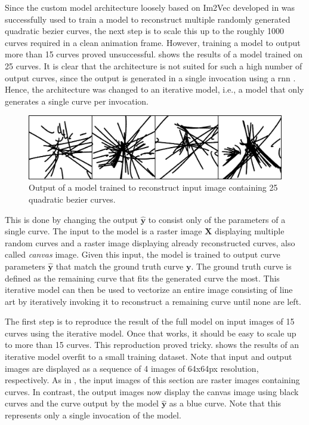 Since the custom model architecture loosely based on Im2Vec \citep{DBLP:conf/cvpr/Reddy21} developed in  was successfully used to train a model to reconstruct multiple randomly generated quadratic bezier curves, the next step is to scale this up to the roughly \num{1000} curves required in a clean animation frame. However, training a model to output more than 15 curves proved unsuccessful.  shows the results of a model trained on 25 curves. It is clear that the architecture is not suited for such a high number of output curves, since the output is generated in a single invocation using a \gls{rnn} \citep{hochreiterdipl,Bengio:1994:LLD:2325857.2328340}. Hence, the architecture was changed to an iterative model, i.e., a model that only generates a single curve per invocation.

\begin{figure}
    \centering
    \includegraphics[width=\textwidth]{graphics/work-artifacts/im2vec/recons_VectorVAEnLayers_1335.png}
    \caption{Output of a model trained to reconstruct input image containing 25 quadratic bezier curves.}
    \label{fig:591.recons}
\end{figure}

This is done by changing the output $\hat{\mathbf{y}}$ to consist only of the parameters of a single curve. The input to the model is a raster image $\mathbf{X}$ displaying multiple random curves and a raster image displaying already reconstructed curves, also called \emph{canvas} image. Given this input, the model is trained to output curve parameters $\hat{\mathbf{y}}$ that match the ground truth curve $\mathbf{y}$. The ground truth curve is defined as the remaining curve that fits the generated curve the most. This iterative model can then be used to vectorize an entire image consisting of line art by iteratively invoking it to reconstruct a remaining curve until none are left.

The first step is to reproduce the result of the full model on input images of 15 curves using the iterative model. Once that works, it should be easy to scale up to more than 15 curves. This reproduction proved tricky.  shows the results of an iterative model overfit to a small training dataset. Note that input and output images are displayed as a sequence of 4 images of 64x64px resolution, respectively. As in , the input images of this section are raster images containing curves. In contrast, the output images now display the canvas image using black curves and the curve output by the model $\hat{\mathbf{y}}$ as a blue curve. Note that this represents only a single invocation of the model.

